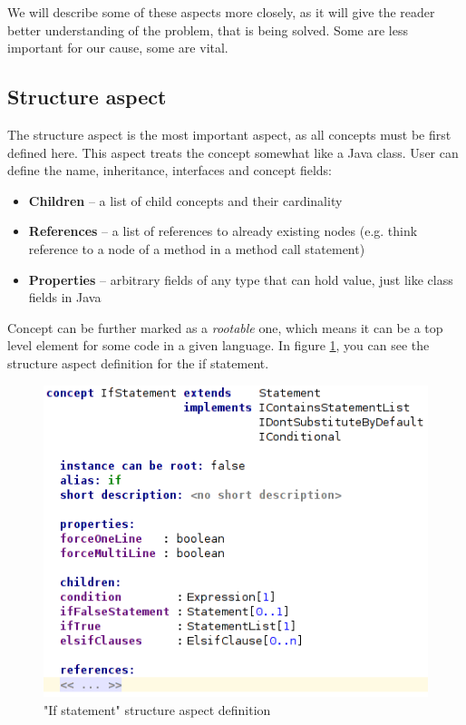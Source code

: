 We will describe some of these aspects more closely, as it will give the reader better understanding of the problem, that is being solved.
Some are less important for our cause, some are vital.

\subsection{Structure aspect}

The structure aspect is the most important aspect, as all concepts must be first defined here.
This aspect treats the concept somewhat like a Java class.
User can define the name, inheritance, interfaces and concept fields:

\begin{itemize}
	\item \textbf{Children} -- a list of child concepts and their cardinality

	\item \textbf{References} -- a list of references to already existing nodes (e.g. think reference to a node of a method in a method call statement)

	\item \textbf{Properties} -- arbitrary fields of any type that can hold value, just like class fields in Java
\end{itemize}

Concept can be further marked as a \textit{rootable} one, which means it can be a top level element for some code in a given language.
In figure \ref{fig:if_statement_structure}, you can see the structure aspect definition for the if statement.

\begin{figure}[h]
	\centering
	\includegraphics[scale=0.75]{./img/if_statement_structure.png}
	\caption{"If statement" structure aspect definition}
	\label{fig:if_statement_structure}
\end{figure}

